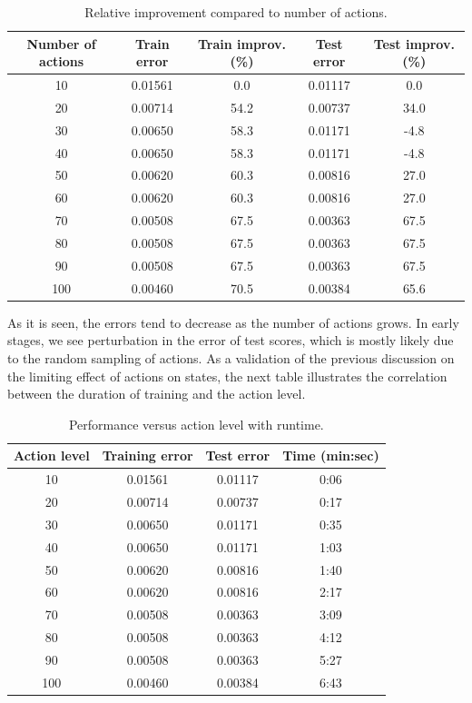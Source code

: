 \documentclass[11pt]{article}
\begin{document}
\begin{table}[H]
\centering
\begin{tabular}{ccccc}
\toprule
Number of actions & Train error & Train improv. (\%) & Test error & Test improv. (\%) \\
\midrule
10  & 0.01561 & 0.0  & 0.01117 & 0.0 \\
20  & 0.00714 & 54.2 & 0.00737 & 34.0 \\
30  & 0.00650 & 58.3 & 0.01171 & -4.8 \\
40  & 0.00650 & 58.3 & 0.01171 & -4.8 \\
50  & 0.00620 & 60.3 & 0.00816 & 27.0 \\
60  & 0.00620 & 60.3 & 0.00816 & 27.0 \\
70  & 0.00508 & 67.5 & 0.00363 & 67.5 \\
80  & 0.00508 & 67.5 & 0.00363 & 67.5 \\
90  & 0.00508 & 67.5 & 0.00363 & 67.5 \\
100 & 0.00460 & 70.5 & 0.00384 & 65.6 \\
\bottomrule
\end{tabular}
\caption{Relative improvement compared to number of actions.}
\end{table}

As it is seen, the errors tend to decrease as the number of actions grows. In early stages, we see perturbation in the error of test scores, which is mostly likely due to the random sampling of actions. As a validation of the previous discussion on the limiting effect of actions on states, the next table illustrates the correlation between the duration of training and the action level.

\begin{table}[H]
\centering
\begin{tabular}{cccc}
\toprule
Action level & Training error & Test error & Time (min:sec) \\
\midrule
10  & 0.01561 & 0.01117 & 0:06 \\
20  & 0.00714 & 0.00737 & 0:17 \\
30  & 0.00650 & 0.01171 & 0:35 \\
40  & 0.00650 & 0.01171 & 1:03 \\
50  & 0.00620 & 0.00816 & 1:40 \\
60  & 0.00620 & 0.00816 & 2:17 \\
70  & 0.00508 & 0.00363 & 3:09 \\
80  & 0.00508 & 0.00363 & 4:12 \\
90  & 0.00508 & 0.00363 & 5:27 \\
100 & 0.00460 & 0.00384 & 6:43 \\
\bottomrule
\end{tabular}
\medskip

\caption{Performance versus action level with runtime.}
\end{table}
\end{document}
